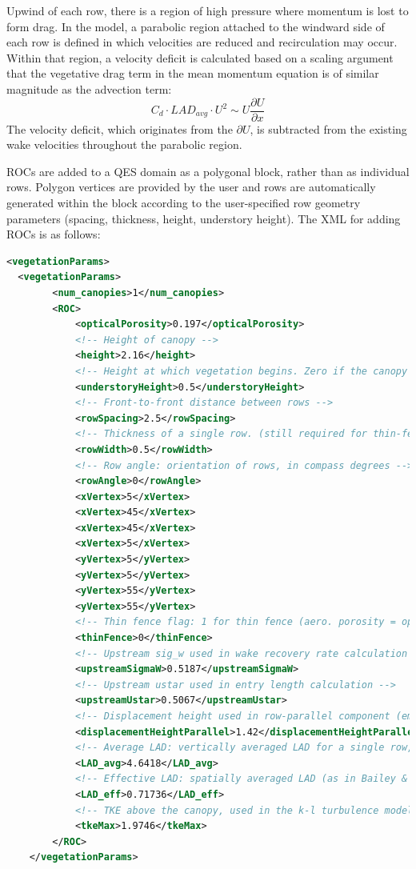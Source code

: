 Upwind of each row, there is a region of high pressure where momentum is lost to form drag. In the model, a parabolic region attached to the windward side of each row is defined in which velocities are reduced and recirculation may occur. Within that region, a velocity deficit is calculated based on a scaling argument that the vegetative drag term in the mean  momentum equation is of similar magnitude as the advection term:
\begin{equation} \label{UDscaling}
     C_d \cdot LAD_{avg} \cdot U^2 \sim U \frac{\partial U}{\partial x}
 \end{equation}
The velocity deficit, which originates from the $\partial U$, is subtracted from the existing wake velocities throughout the parabolic region.

ROCs are added to a QES domain as a polygonal block, rather than as individual rows. Polygon vertices are provided by the user and rows are automatically generated within the block according to the user-specified row geometry parameters (spacing, thickness, height, understory height). The XML for adding ROCs is as follows:
\begin{lstlisting}[language=XML]
<vegetationParams>
  <vegetationParams>
        <num_canopies>1</num_canopies>
        <ROC>
            <opticalPorosity>0.197</opticalPorosity>
            <!-- Height of canopy -->
            <height>2.16</height>
            <!-- Height at which vegetation begins. Zero if the canopy extends to the ground. -->
            <understoryHeight>0.5</understoryHeight>
            <!-- Front-to-front distance between rows -->
            <rowSpacing>2.5</rowSpacing>
            <!-- Thickness of a single row. (still required for thin-fence parameterization) -->
            <rowWidth>0.5</rowWidth>
            <!-- Row angle: orientation of rows, in compass degrees -->
            <rowAngle>0</rowAngle>
            <xVertex>5</xVertex>
            <xVertex>45</xVertex>
            <xVertex>45</xVertex>
            <xVertex>5</xVertex>
            <yVertex>5</yVertex>
            <yVertex>5</yVertex>
            <yVertex>55</yVertex>
            <yVertex>55</yVertex>
            <!-- Thin fence flag: 1 for thin fence (aero. porosity = optical porosity), 2 for vegetative row (aero. por. from LAD) -->
            <thinFence>0</thinFence>
            <!-- Upstream sig_w used in wake recovery rate calculation -->
            <upstreamSigmaW>0.5187</upstreamSigmaW>
            <!-- Upstream ustar used in entry length calculation -->
            <upstreamUstar>0.5067</upstreamUstar>
            <!-- Displacement height used in row-parallel component (empirical) -->
            <displacementHeightParallel>1.42</displacementHeightParallel>
            <!-- Average LAD: vertically averaged LAD for a single row, used in upwind displacement zone drag calculation -->
            <LAD_avg>4.6418</LAD_avg>
            <!-- Effective LAD: spatially averaged LAD (as in Bailey & Stoll, 2013), a bulk drag parameter used in entry length calculation -->
            <LAD_eff>0.71736</LAD_eff>
            <!-- TKE above the canopy, used in the k-l turbulence model -->
            <tkeMax>1.9746</tkeMax>
        </ROC>
    </vegetationParams>
\end{lstlisting}
